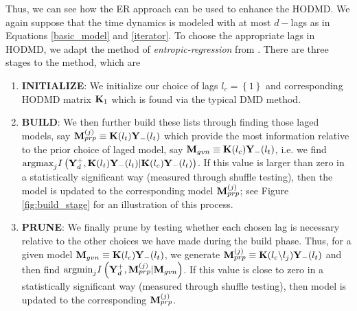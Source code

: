 \documentclass[a4paper,11pt]{article}
\begin{document}
Thus, we can see how the ER approach can be used to enhance the  HODMD.  We again suppose that the time dynamics is modeled with at most $d-$lags as in Equations \eqref{basic_model} and \eqref{iterator}.  To choose the appropriate lags in HODMD, we adapt the method of {\it entropic-regression} from \cite{bollt2}.  There are three stages to the method, which are 
\begin{enumerate}
\item {\bf INITIALIZE}: We initialize our choice of lags $l_{c}=\left\{1\right\}$ and corresponding HODMD matrix ${\bf K}_{1}$ which is found via the typical DMD method.    
\item {\bf BUILD}: We then further build these lists through finding those laged models, say ${\bf M}^{(j)}_{prp}\equiv {\bf K}(l_{t}){\bf Y}_{-}(l_{t})$ which provide the most information relative to the prior choice of laged model, say ${\bf M}_{gvn}\equiv {\bf K}(l_{c}){\bf Y}_{-}(l_{t})$, i.e. we find $\text{argmax}_{j}I\left({\bf Y}^{+}_{d},{\bf K}(l_{t}){\bf Y}_{-}(l_{t})|{\bf K}(l_{c}){\bf Y}_{-}(l_{t})\right)$.  If this value is larger than zero in a statistically significant way (measured through shuffle testing), then the model is updated to the corresponding model ${\bf M}^{(j)}_{prp}$; see Figure \ref{fig:build_stage} for an illustration of this process.    
\item {\bf PRUNE}: We finally prune by testing whether each chosen lag is necessary relative to the other choices we have made during the build phase.  Thus, for a given model ${\bf M}_{gvn}\equiv {\bf K}(l_{c}){\bf Y}_{-}(l_{t})$, we generate ${\bf M}^{(j)}_{prp}\equiv {\bf K}(l_{c}\backslash l_{j}){\bf Y}_{-}(l_{t})$ and then find $\text{argmin}_{j}I\left({\bf Y}^{+}_{d},{\bf M}^{(j)}_{prp}|{\bf M}_{gvn}\right)$.  If this value is close to zero in a statistically significant way (measured through shuffle testing), then model is updated to the corresponding ${\bf M}^{(j)}_{prp}$.  
\end{enumerate}
\end{document}
